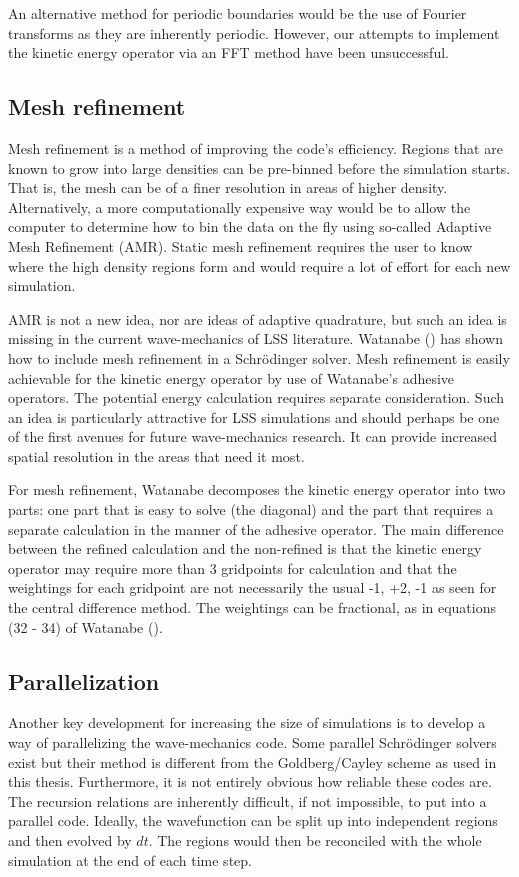 An alternative method for periodic boundaries would be the use of Fourier transforms as they are inherently periodic. However, our attempts to implement the kinetic energy operator via an FFT method have been unsuccessful.

\subsection{Mesh refinement}
Mesh refinement is a method of improving the code's efficiency. Regions that are known to grow into large densities can be pre-binned before the simulation starts. That is, the mesh can be of a finer resolution in areas of higher density. Alternatively, a more computationally expensive way would be to allow the computer to determine how to bin the data on the fly using so-called Adaptive Mesh Refinement (AMR). Static mesh refinement requires the user to know where the high density regions form and would require a lot of effort for each new simulation.

AMR is not a new idea, nor are ideas of adaptive quadrature, but such an idea is missing in the current wave-mechanics of LSS literature.
Watanabe (\citeyear{bib_wat}) has shown how to include mesh refinement in a Schr\"odinger solver. Mesh refinement is easily achievable for the kinetic energy operator by use of Watanabe's adhesive operators. The potential energy calculation requires separate consideration. Such an idea is particularly attractive for LSS simulations and should perhaps be one of the first avenues for future wave-mechanics research. It can provide increased spatial resolution in the areas that need it most.

For mesh refinement, Watanabe decomposes the kinetic energy operator into two parts: one part that is easy to solve (the diagonal) and the part that requires a separate calculation in the manner of the adhesive operator. The main difference between the refined calculation and the non-refined is that the kinetic energy operator may require more than 3 gridpoints for calculation and that the weightings for each gridpoint are not necessarily the usual -1, +2, -1 as seen for the central difference method. The weightings can be fractional, as in equations (32 - 34) of Watanabe (\citeyear{bib_wat}).

\subsection{Parallelization}
Another key development for increasing the size of simulations is to develop a way of parallelizing the wave-mechanics code. Some parallel Schr\"odinger solvers \citep{bib_yee, bib_schn, bib_str} exist but their method is different from the Goldberg/Cayley scheme as used in this thesis. Furthermore, it is not entirely obvious how reliable these codes are. The recursion relations are inherently difficult, if not impossible, to put into a parallel code. Ideally, the wavefunction can be split up into independent regions and then evolved by $dt$. The regions would then be reconciled with the whole simulation at the end of each time step.

